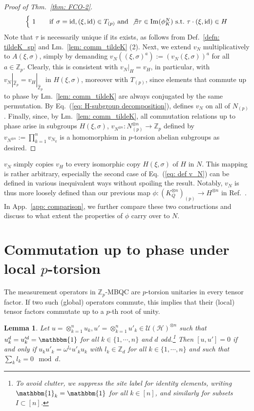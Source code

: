 \documentclass[aps,pra,letterpaper,onrcolumn,nofootinbib,notitlepage,longbibliography]{revtex4-1}
\newtheorem{lemma}{Lemma}
\newcommand{\mf}[1]{#1}
\newcommand{\one}{\mathbbm{1}}
\newcommand{\id}{\mathrm{id}}
\newcommand{\UH}{\mc{U}(\cH)}
\newcommand{\ra}{\ensuremath{\rightarrow}}
\newcommand{\zz}{\mathbb Z}
\newcommand\mc[1]{\mathcal{#1}}
\newcommand{\cH}{\mc{H}}
\begin{document}
\begin{proof}[Proof of Thm.~\ref{thm: FCO-2}]
\begin{align}
\begin{cases}
            \ 1 & \quad\mathrm{if}\ \sigma=\id,(\xi,\id)\in T_{(p)}\ \mathrm{and}\ \not\exists\tau\in\mathrm{Im}(\phi^N_K)\ \mathrm{s.t.}\ \tau\cdot(\xi,\id)\in H
        \end{cases}
    \end{align}
    Note that $\tau$ is necessarily unique if its exists, as follows from Def.~\ref{defn: tildeK_sp} and Lm.~\ref{lem: comm_tildeK} (2). Next, we extend $v_N$ multiplicatively to $A(\xi,\sigma)$, simply by demanding $v_N((\xi,\sigma)^a):=(v_N(\xi,\sigma))^a$ for all $a\in\zz_p$. Clearly, this is consistent with $v_N|_H=v_H$, in particular, with $v_N|_{\hat{\zz}_p}=v_H|_{\hat{\zz}_p}$ in $H(\xi,\sigma)$, \mf{moreover with $T_{(p)}$, since elements that commute up to phase by Lm.~\ref{lem: comm_tildeK} are always conjugated by the same permutation.}
    By Eq.~(\ref{eq: H-subgroup decomposition}), defines $v_N$ on all of $N_{(p)}$. Finally, since, by Lm.~\ref{lem: comm_tildeK}, all commutation relations up to phase arise in subgroups $H(\xi,\sigma)$, $v_{N^{\otimes n}}:N^{\otimes n}_{(p)}\ra\zz_p$ defined by $v_{N^{\otimes n}}:=\prod_{k=1}^n v_{N_k}$ is a homomorphism in $p$-torsion abelian subgroups as desired.
\end{proof}

$v_N$ simply copies $v_H$ to every isomorphic copy $H(\xi,\sigma)$ of $H$ in $N$. This mapping is rather arbitrary, especially the second case of Eq.~(\ref{eq: def v_N}) can be defined in various inequivalent ways without spoiling the result. Notably, $v_N$ is thus more loosely defined than our previous map $\phi:(K^{\otimes n}_Q)_{(p)}\ra H^{\otimes n}$ in Ref.~\cite{FrembsChungOkay2022}. In App.~\ref{app: comparison}, we further compare these two constructions and discuss to what extent the properties of $\phi$ carry over to $N$.
\section{Commutation up to phase under local $p$-torsion}\label{app: proof 2}

The measurement operators in $\zz_p$-MBQC are $p$-torsion unitaries in every tensor factor. If two such (global) operators commute, this implies that their (local) tensor factors commutate up to a $p$-th root of unity.

\begin{lemma}\label{lm: qudit commutation relations reduce to Paulis}
    Let $u=\otimes_{k=1}^n u_k, u'=\otimes_{k=1}^n u'_k \in\UH^{\otimes n}$ such that $u_k^d=u'^d_k=\one$ for all $k\in\{1,\cdots,n\}$ and $d$ odd.\footnote{To avoid clutter, we suppress the site label for identity elements, writing $\one_k=\one$ for all $k\in[n]$, and similarly for subsets $I\subset[n]$.} Then $[u,u']=0$ if and only if $u_ku'_k=\omega^{l_k}u'_ku_k$ with $l_k\in\zz_d$ for all $k\in\{1,\cdots,n\}$ and such that $\sum_k l_k=0\mod d$.
\end{lemma}
\end{document}
